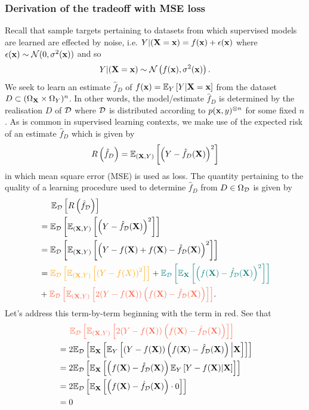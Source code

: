 \documentclass[11pt]{article}
\begin{document}
\subsubsection{Derivation of the tradeoff with MSE loss}
Recall that sample targets pertaining to datasets from which supervised models are learned are effected by noise, i.e. $Y|(\mathbf{X}=\mathbf{x})=f(\mathbf{x})+\epsilon(\mathbf{x})$ where $\epsilon(\mathbf{x})\sim\mathcal{N}(0,\sigma^2(\mathbf{x}))$ and so
$$
Y|(\mathbf{X}=\mathbf{x})
\sim
\mathcal{N}\left(f(\mathbf{x}), \sigma^2(\mathbf{x})\right).
$$
We seek to learn an estimate $\hat{f}_{D}$ of $f(\mathbf{x})=\mathbb{E}_Y\left[Y|\mathbf{X}=\mathbf{x}\right]$ from the dataset $D\subset(\Omega_{\mathbf{X}}\times\Omega_Y)^n$. In other words, the model/estimate $\hat{f}_{D}$ is determined by the realisation $D$ of $\mathcal{D}$ where $\mathcal{D}$ is distributed according to $p(\mathbf{x},y)^{\otimes n}$ for some fixed $n$. As is common in supervised learning contexts, we make use of the expected risk of an estimate $\hat{f}_D$ which is given by
$$
R\left(\hat{f}_D\right)
=
\mathbb{E}_{(\mathbf{X},Y)}\left[\left(Y-\hat{f}_D(\mathbf{X})\right)^2\right]
$$
in which mean square error (MSE) is used as loss. The quantity pertaining to the quality of a learning procedure used to determine $\hat{f}_{D}$ from $D\in\Omega_{\mathcal{D}}$ is given by
\begin{align*}
    &\hspace{14.52pt}
    \E_{\D}\l[R\l(\hat{f}_{\D}\r)\r]\\
    &=
    \E_{\D}\l[\E_{(\X,Y)}\l[\l(Y-\hat{f}_{\D}(\X)\r)^2\r]\r]\nonumber\\
    &=
    \E_{\D}\l[\E_{(\X,Y)}\l[\l(Y-f(\X)+f(\X)-\hat{f}_{\D}(\X)\r)^2\r]\r]\nonumber\\
    &=
    \textcolor{myYellow}{\E_{\D}\l[\E_{(\X,Y)}\l[\l(Y-f(X)\r)^2\r]\r]}+
    \textcolor{myGreen}{\E_{\D}\l[\E_\X\l[\l(f(\X)-\hat{f}_{\D}(\X)\r)^2\r]\r]}\\
    &+\textcolor{myLightRed}{\E_{\D}\l[\E_{(\X,Y)}\l[2(Y-f(\X))\l(f(\X)-\hat{f}_{\D}(\X)\r)\r]\r]}.
\end{align*}
Let's address this term-by-term beginning with the term in red. See that
\begin{align*}
    &\hspace{14.52pt}
    \textcolor{myLightRed}{\E_{\D}\l[\E_{(\X,Y)}\l[2(Y-f(\X))\l(f(\X)-\hat{f}_{\D}(\X)\r)\r]\r]}\\
    &=
    2\E_{\D}\l[\E_\X\l[\E_{Y}\l[(Y-f(\X))\l(f(\X)-\hat{f}_{\D}(\X)\r)\Big|\X\r]\r]\r]\\
    &=
    2\E_{\D}\l[\E_\X\l[\l(f(\X)-\hat{f}_{\D}(\X)\r)\E_{Y}\l[Y-f(\X)\vert\X\r]\r]\r]\\
    &=
    2\E_{\D}\l[\E_\X\l[\l(f(\X)-\hat{f}_{\D}(\X)\r)\cdot0\r]\r]\\
    &=
    0
\end{align*}
\end{document}

